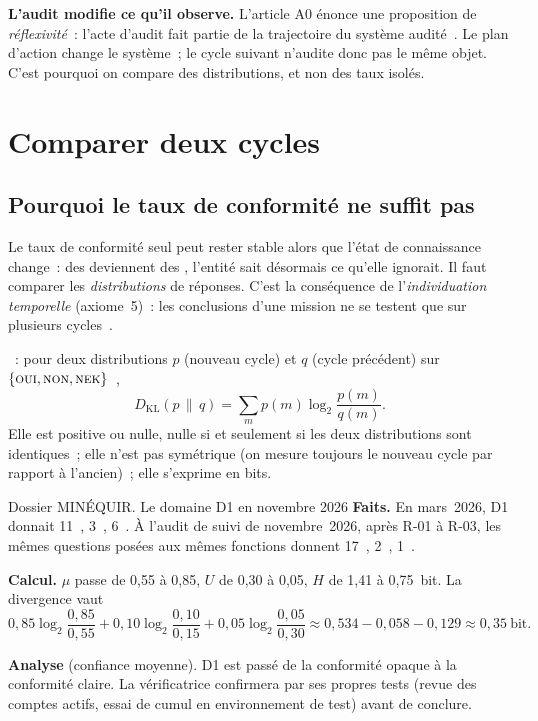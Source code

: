 \begin{boxinfo}
\textbf{L'audit modifie ce qu'il observe.} L'article A0 énonce une
proposition de \emph{réflexivité}~: l'acte d'audit fait partie de la
trajectoire du système audité~\cite{minka2026auditologie}. Le plan d'action
change le système~; le cycle suivant n'audite donc pas le même objet. C'est
pourquoi on compare des distributions, et non des taux isolés.
\end{boxinfo}

\separateur

\section{Comparer deux cycles}
\label{sec:c08-cycles}

\subsection{Pourquoi le taux de conformité ne suffit pas}

Le taux de conformité seul peut rester stable alors que l'état de
connaissance change~: des \NEK{} deviennent des \NON{}, l'entité sait
désormais ce qu'elle ignorait. Il faut comparer les \emph{distributions} de
réponses. C'est la conséquence de l'\emph{individuation temporelle}
(axiome~5)~: les conclusions d'une mission ne se testent que sur plusieurs
cycles~\cite{minka2026auditologie}.

\begin{boxdef}
~: pour deux distributions $p$ (nouveau cycle) et $q$
(cycle précédent) sur $\{\textsc{oui}, \textsc{non}, \textsc{nek}\}$~\cite{kullback1951,minka2026nek},
\[
    D_{\mathrm{KL}}(p \,\|\, q) = \sum_{m} p(m) \log_2 \frac{p(m)}{q(m)}.
\]
Elle est positive ou nulle, nulle si et seulement si les deux distributions
sont identiques~; elle n'est pas symétrique (on mesure toujours le nouveau
cycle par rapport à l'ancien)~; elle s'exprime en bits.
\end{boxdef}

\begin{boxscenario}{Dossier MINÉQUIR. Le domaine D1 en novembre 2026}
\textbf{Faits.} En mars~2026, D1 donnait 11~\OUI{}, 3~\NON{}, 6~\NEK{}. À
l'audit de suivi de novembre~2026, après R-01 à R-03, les mêmes questions
posées aux mêmes fonctions donnent 17~\OUI{}, 2~\NON{}, 1~\NEK{}.

\medskip
\textbf{Calcul.} $\mu$ passe de 0,55 à 0,85, $U$ de 0,30 à 0,05, $H$ de 1,41
à 0,75~bit. La divergence vaut
\[
    0{,}85\log_2\frac{0{,}85}{0{,}55} + 0{,}10\log_2\frac{0{,}10}{0{,}15} +
    0{,}05\log_2\frac{0{,}05}{0{,}30} \approx 0{,}534 - 0{,}058 - 0{,}129
    \approx 0{,}35~\text{bit}.
\]

\textbf{Analyse} (confiance moyenne). D1 est passé de la conformité opaque
à la conformité claire. La vérificatrice confirmera par ses propres tests
(revue des comptes actifs, essai de cumul en environnement de test) avant
de conclure.
\end{boxscenario}

